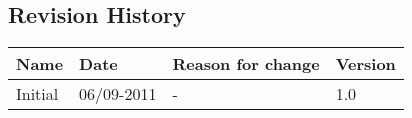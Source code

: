\subsection{Revision History}
\begin{tabular}[t]{|l|l|l|l|}\hline
Name&Date&Reason for change&Version\\\hline\hline
Initial&06/09-2011&-&1.0\\\hline
\end{tabular}

\pagebreak